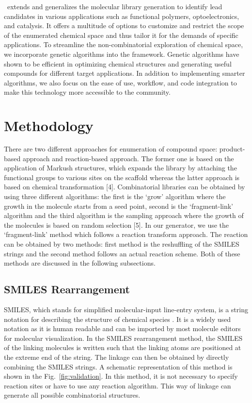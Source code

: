 \chemlg\ extends and generalizes the molecular library generation to identify lead candidates in various applications such as functional polymers, optoelectronics, and catalysis. It offers a multitude of options to customize and restrict the scope of the enumerated chemical space and thus tailor it for the demands of specific applications. To streamline the non-combinatorial exploration of chemical space, we incorporate genetic algorithms into the framework. Genetic algorithms have shown to be efficient in optimizing chemical structures and generating useful compounds for different target applications. In addition to implementing smarter algorithms, we also focus on the ease of use, workflow, and code integration to make this technology more accessible to the community. 


\section{Methodology}

There are two different approaches for enumeration of compound space: product-based approach and reaction-based approach. The former one is based on the application of Markush structures, which expands the library by attaching the functional groups to various sites on the scaffold whereas the latter approach is based on chemical transformation [4]. Combinatorial libraries can be obtained by using three different algorithms: the first is the ‘grow’ algorithm where the growth in the molecule starts from a seed point, second is the ‘fragment-link’ algorithm and the third algorithm is the sampling approach where the growth of the molecules is based on random selection [5]. In our generator, we use the ‘fragment-link’ method which follows a reaction transform approach. The reaction can be obtained by two methods: first method is the reshuffling of the SMILES strings and the second method follows an actual reaction scheme. Both of these methods are discussed in the following subsections. 

\subsection{SMILES Rearrangement}

SMILES, which stands for simplified molecular-input line-entry system, is a string notation for describing the structure of chemical species \cite{Anderson1987}. It is a widely used notation as it is human readable and can be imported by most molecule editors for molecular visualization. In the SMILES rearrangement method, the SMILES of the linking molecules is written such that the linking atoms are positioned at the extreme end of the string. The linkage can then be obtained by directly combining the SMILES strings. A schematic representation of this method is shown in the Fig.\ \ref{fig:validation}. In this method, it is not necessary to specify reaction sites or have to use any reaction algorithm. This way of linkage can generate all possible combinatorial structures. 

